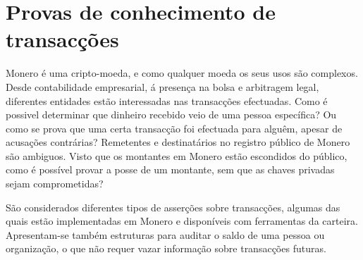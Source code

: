 \chapter{Provas de conhecimento de transacções}
\label{chapter:tx-knowledge-proofs}

\iffalse
https://github.com/monero-project/monero/pull/6329/files

https://monero.stackexchange.com/questions/8122/what-is-the-spendproofv1-or-outproofv1-in-the-details-of-a-sent-transa

https://monero.stackexchange.com/questions/9991/how-does-the-get-reserve-proof-command-work

https://github.com/monero-project/research-lab/issues/68
\fi
Monero é uma cripto-moeda, e como qualquer moeda os seus usos são complexos. 
Desde contabilidade empresarial, á presença na bolsa e arbitragem legal, diferentes entidades estão interessadas nas transacções efectuadas. 
Como é possivel determinar que dinheiro recebido veio de uma pessoa específica? Ou como se prova que uma certa transacção foi efectuada para alguêm, apesar de acusações contrárias? Remetentes e destinatários no registro público de Monero são ambiguos. Visto que os montantes em Monero estão escondidos do público, como é possível provar a posse de um montante, sem que as chaves privadas sejam comprometidas? 

São considerados diferentes tipos de asserções sobre transacções, algumas das quais estão implementadas em Monero e disponíveis com ferramentas da carteira. Apresentam-se também estruturas para auditar o saldo de uma pessoa ou organização, o que não requer vazar informação sobre transacções futuras.  




